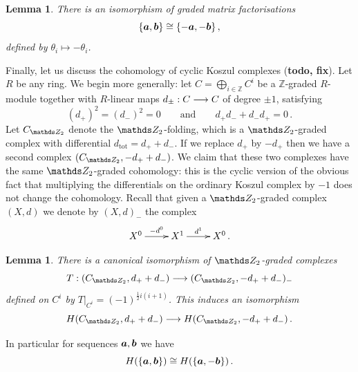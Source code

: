 \documentclass{compositio}
\newtheorem{lemma}[theorem]{Lemma}
\theoremstyle{definition}
\numberwithin{equation}{section}
\begin{document}
\begin{lemma}\label{lemma:cyclickos3} There is an isomorphism of graded matrix factorisations
\[
\{ \boldsymbol{a}, \boldsymbol{b} \} \cong \{ -\boldsymbol{a}, - \boldsymbol{b} \}\,,
\]
defined by $\theta_i \longmapsto - \theta_i$.
\end{lemma}

Finally, let us discuss the cohomology of cyclic Koszul complexes (\textbf{todo, fix}). Let $R$ be any ring. We begin more generally: let $C = \bigoplus_{i \in \mathds{Z}} C^i$ be a $\mathds{Z}$-graded $R$-module together with $R$-linear maps $d_{\pm}: C \longrightarrow C$ of degree $\pm 1$, satisfying
\[
(d_+)^2 = (d_{-})^2 = 0 \qquad \text{and} \qquad d_{+}d_{-} + d_{-}d_{+} = 0 \, .
\]
Let $C_{\Ztwo}$ denote the $\Ztwo$-folding, which is a $\Ztwo$-graded complex with differential $d_{\text{tot}} = d_+ + d_{-}$. If we replace $d_{+}$ by $-d_{+}$ then we have a second complex $(C_{\Ztwo}, -d_{+} + d_{-})$. We claim that these two complexes have the same $\Ztwo$-graded cohomology: this is the cyclic version of the obvious fact that multiplying the differentials on the ordinary Koszul complex by $-1$ does not change the cohomology. Recall that given a $\Ztwo$-graded complex $(X,d)$ we denote by $(X,d)_{-}$ the complex
\[
\xymatrix{%
X^0 \ar[r]^-{-d^0} & X^1 \ar[r]^-{d^1} & X^0\,.
}
\]

\begin{lemma}\label{lemma:cyclickoszulsign} There is a canonical isomorphism of $\Ztwo$-graded complexes
\[
T: (C_{\Ztwo}, d_{+} + d_{-}) \lto (C_{\Ztwo}, -d_{+} + d_{-})_{-}
\]
defined on $C^i$ by $T|_{C^i} = (-1)^{\frac{1}{2}i(i+1)}$. This induces an isomorphism
\[
H(C_{\Ztwo}, d_{+} + d_{-}) \lto H(C_{\Ztwo}, -d_{+} + d_{-}) \, .
\]
\end{lemma}

In particular for sequences $\boldsymbol{a}, \boldsymbol{b}$ we have
\begin{equation}
\label{Habba}
H(\{ \boldsymbol{a}, \boldsymbol{b} \}) \cong H(\{\boldsymbol{a}, -\boldsymbol{b}\}) \, .
\end{equation}
\end{document}
